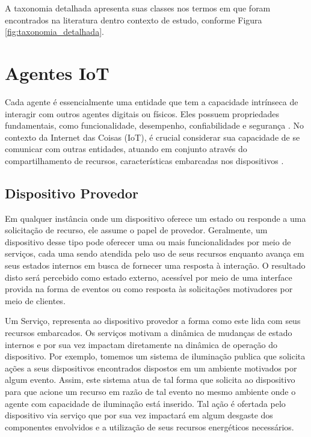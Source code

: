 A taxonomia detalhada apresenta suas classes nos termos em que foram encontrados na literatura dentro contexto de estudo, conforme Figura \ref{fig:taxonomia_detalhada}.

\section{Agentes \acs{IoT}}
Cada agente é essencialmente uma entidade que tem a capacidade intrínseca de interagir com outros agentes digitais ou físicos. Eles possuem propriedades fundamentais, como funcionalidade, desempenho, confiabilidade e segurança \cite{avizienis_basic_2004}. No contexto da Internet das Coisas (IoT), é crucial considerar sua capacidade de se comunicar com outras entidades, atuando em conjunto através do compartilhamento de recursos, características embarcadas nos dispositivos \cite{asghari_internet_2019}.


\subsection{Dispositivo Provedor}

Em qualquer instância onde um dispositivo oferece um estado ou responde a uma solicitação de recurso, ele assume o papel de provedor. Geralmente, um dispositivo desse tipo pode oferecer uma ou mais funcionalidades por meio de serviços, cada uma sendo atendida pelo uso de seus recursos enquanto avança em seus estados internos em busca de fornecer uma resposta à interação. O resultado disto será percebido como  estado externo, acessível por meio de uma interface provida na forma de eventos ou como resposta às solicitações motivadores por meio de clientes. 

Um Serviço, representa ao dispositivo provedor a forma como este lida com seus recursos embarcados. Os serviços motivam a dinâmica de mudanças de estado internos e por sua vez impactam diretamente na dinâmica de operação do dispositivo.  Por exemplo, tomemos um sistema de iluminação publica que solicita ações  a seus dispositivos encontrados dispostos em um ambiente motivados por algum evento. Assim, este sistema atua de tal forma que solicita ao dispositivo para que acione um recurso em razão de tal evento no mesmo ambiente onde o agente com capacidade de iluminação está inserido. Tal ação é ofertada pelo dispositivo via serviço que por sua vez impactará em algum desgaste dos componentes envolvidos e a utilização de seus recursos energéticos necessários.

